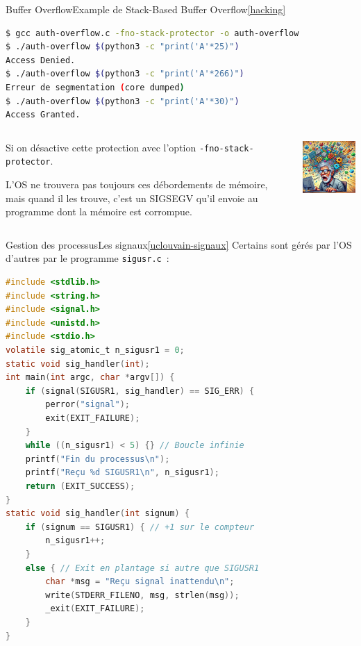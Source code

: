 \documentclass{beamer}
\begin{document}
    \begin{frame}[fragile]{Buffer Overflow}{Example de Stack-Based Buffer Overflow\cref{hacking}}
        \begin{lstlisting}[language=bash]
$ gcc auth-overflow.c -fno-stack-protector -o auth-overflow
$ ./auth-overflow $(python3 -c "print('A'*25)")
Access Denied.
$ ./auth-overflow $(python3 -c "print('A'*266)")
Erreur de segmentation (core dumped)
$ ./auth-overflow $(python3 -c "print('A'*30)")
Access Granted.
        \end{lstlisting}
        \bigbreak
        \begin{columns}
            \begin{column}{0.6\textwidth}
                Si on désactive cette protection avec l'option \lstinline{-fno-stack-protector}.
                \begin{dangercolorbox}
                    L'OS ne trouvera pas toujours ces débordements de mémoire, mais quand il les trouve, c'est un SIGSEGV qu'il envoie au programme dont la mémoire est corrompue.
                \end{dangercolorbox}
            \end{column}
            \begin{column}{0.4\textwidth}
                \includegraphics[width=5cm]{image/old-programmer-exploding}
            \end{column}
        \end{columns}
    \end{frame}

    \begin{frame}[fragile]{Gestion des processus}{Les signaux\cref{uclouvain-signaux}}
        Certains sont gérés par l'OS d'autres par le programme \lstinline{sigusr.c}~:
        \begin{lstlisting}[language=C,basicstyle=\tiny\ttfamily]
#include <stdlib.h>
#include <string.h>
#include <signal.h>
#include <unistd.h>
#include <stdio.h>
volatile sig_atomic_t n_sigusr1 = 0;
static void sig_handler(int);
int main(int argc, char *argv[]) {
    if (signal(SIGUSR1, sig_handler) == SIG_ERR) {
        perror("signal");
        exit(EXIT_FAILURE);
    }
    while ((n_sigusr1) < 5) {} // Boucle infinie
    printf("Fin du processus\n");
    printf("Reçu %d SIGUSR1\n", n_sigusr1);
    return (EXIT_SUCCESS);
}
static void sig_handler(int signum) {
    if (signum == SIGUSR1) { // +1 sur le compteur
        n_sigusr1++;
    }
    else { // Exit en plantage si autre que SIGUSR1
        char *msg = "Reçu signal inattendu\n";
        write(STDERR_FILENO, msg, strlen(msg));
        _exit(EXIT_FAILURE);
    }
}
        \end{lstlisting}
    \end{frame}
\end{document}
